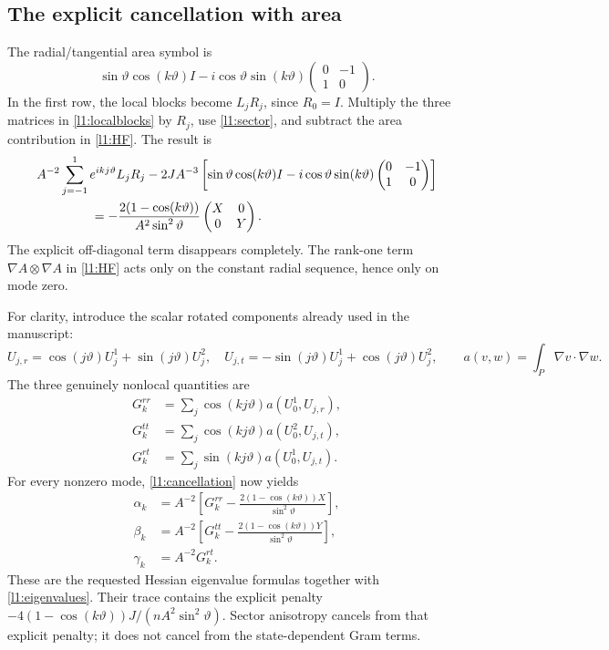 \subsection{The explicit cancellation with area}
The radial/tangential area symbol is
\[
 \sin\vartheta\cos(k\vartheta)I
 -i\cos\vartheta\sin(k\vartheta)
                  \begin{pmatrix}0&-1\\1&0\end{pmatrix}.
\]
In the first row, the local blocks become $L_jR_j$, since $R_0=I$.
Multiply the three matrices in \eqref{l1:localblocks} by $R_j$, use
\eqref{l1:sector}, and subtract the area contribution in \eqref{l1:HF}.
The result is
\begin{align}
 &A^{-2}\sum_{j=-1}^{1}e^{ikj\vartheta}L_jR_j
 -2JA^{-3}\left[\sin\vartheta\cos(k\vartheta)I
 -i\cos\vartheta\sin(k\vartheta)
       \begin{pmatrix}0&-1\\1&0\end{pmatrix}\right]\notag\\
 &\hspace{15mm}=-\frac{2(1-\cos(k\vartheta))}{A^2\sin^2\vartheta}
                    \begin{pmatrix}X&0\\0&Y\end{pmatrix}.
 \label{l1:cancellation}
\end{align}
The explicit off-diagonal term disappears completely. The rank-one term
$\nabla A\otimes\nabla A$ in \eqref{l1:HF} acts only on the constant
radial sequence, hence only on mode zero.

For clarity, introduce the scalar rotated components already used in the
manuscript:
\[
 U_{j,r}=\cos(j\vartheta)U_j^1+\sin(j\vartheta)U_j^2,\quad
 U_{j,t}=-\sin(j\vartheta)U_j^1+\cos(j\vartheta)U_j^2,
 \qquad a(v,w)=\int_P\nabla v\cdot\nabla w.
\]
The three genuinely nonlocal quantities are
\begin{align*}
 G^{rr}_k&=\sum_j\cos(kj\vartheta)a(U_0^1,U_{j,r}),\\
 G^{tt}_k&=\sum_j\cos(kj\vartheta)a(U_0^2,U_{j,t}),\\
 G^{rt}_k&=\sum_j\sin(kj\vartheta)a(U_0^1,U_{j,t}).
\end{align*}
For every nonzero mode, \eqref{l1:cancellation} now yields
\begin{equation}
 \boxed{\begin{aligned}
 \alpha_k&=A^{-2}\left[G^{rr}_k-
          \frac{2(1-\cos(k\vartheta))X}{\sin^2\vartheta}\right],\\
 \beta_k&=A^{-2}\left[G^{tt}_k-
          \frac{2(1-\cos(k\vartheta))Y}{\sin^2\vartheta}\right],\\
 \gamma_k&=A^{-2}G^{rt}_k.
 \end{aligned}}
 \label{l1:finalentries}
\end{equation}
These are the requested Hessian eigenvalue formulas together with
\eqref{l1:eigenvalues}. Their trace contains the explicit penalty
$-4(1-\cos(k\vartheta))J/(nA^2\sin^2\vartheta)$.
Sector anisotropy cancels from that explicit penalty; it does not cancel
from the state-dependent Gram terms.

